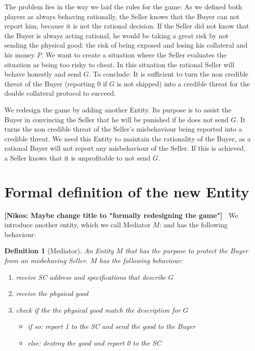 \documentclass{cacthesis}
\newcommand{\authnote}[3]{{ \footnotesize \textbf{#1[#2: #3]~}}}
\newcommand{\niknote}[1]{\authnote{\color{red}}{Nikos}{#1}}
\newtheorem{definition}{Definition}
\begin{document}
The problem lies in the way we laid the rules for the game: As we defined both players as always behaving rationally, the Seller knows that the Buyer can not report him, because it is not the rational decision.
If the Seller did not know that the Buyer is always acting rational, he would be taking a great risk by not sending the physical good: the risk of being exposed and losing his collateral and his money $P$.
We want to create a situation where the Seller evaluates the situation as being too risky to cheat. In this situation the rational Seller will behave honestly and  send $G$.
To conclude: It is sufficient to turn the non credible threat of the Buyer (reporting 0 if $G$ is not shipped) into a credible threat for the double collateral protocol to succeed.\newline

We redesign the game by adding another Entity. Its purpose is to assist the Buyer in convincing the Seller that he will be punished if he does not send $G$. It turns the non credible threat of the Seller's misbehaviour being reported into a credible threat. We need this Entity to maintain the rationality of the Buyer, as a rational Buyer will not report any misbehaviour of the Seller.
If this is achieved, a Seller knows that it is unprofitable to not send $G$.\newline


\section{Formal definition of the new Entity}
\niknote{Maybe change title to "formally redesigning the game"}
We introduce another entity, which we call Mediator $M$: and has the following behaviour:
\begin{definition}[Mediator]
\label{def:mediator}
An Entity $M$ that has the purpose to protect the Buyer from an misbehaving Seller. $M$ has the following behaviour:
\begin{enumerate}
    \item receive SC address and specifications that describe $G$
    \item receive the physical good
    \item check if the the physical good match the description for $G$
    \begin{itemize}
        \item if so: report 1 to the SC and send the good to the Buyer
        \item else: destroy the good and report 0 to the SC
    \end{itemize}
\end{enumerate}
\end{definition}
\end{document}
